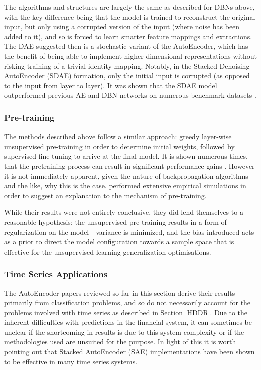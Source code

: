 \documentclass[a4paper,11pt,oneside]{article}
\theoremstyle{plain}
\theoremstyle{definition}
\begin{document}
	The algorithms and structures are largely the same as described for DBNs above, with the key difference 
	being that the model is trained to reconstruct the original input, but only using a corrupted version of the input 
	(where noise has been added to it), and so is forced to learn smarter feature mappings and extractions. 
	The DAE suggested then is a stochastic variant of the AutoEncoder, which has the benefit of being able to 
	implement higher dimensional representations without risking training of a trivial identity mapping. Notably, 
	in the Stacked Denoising AutoEncoder (SDAE) formation, only the initial input is corrupted (as opposed to the 
	input from layer to layer). It was shown that the SDAE model outperformed previous AE and DBN networks on 
	numerous benchmark datasets \citep{Vincent} . 
	
	\subsubsection{Pre-training}
	
	The methods described above follow a similar approach: greedy layer-wise unsupervised pre-training in order to 
	determine initial weights, followed by supervised fine tuning to arrive at the final model. It is shown numerous times, 
	that the pretraining process can result in significant performance gains \citep{Vincent}. However it is not immediately apparent, 
	given the nature of backpropagation algorithms and the like, why this is the case. \citet{Erhan} performed 
	extensive empirical simulations in order to suggest an explanation to the mechanism of pre-training.
	\hfill \break 
	
	While their results were not entirely conclusive, they did lend themselves to a reasonable hypothesis: 
	the unsupervised pre-training results in a form of regularization on the model - variance is minimized, and the 
	bias introduced acts as a prior to direct the model configuration towards a sample space that is effective for the unsupervised 
	learning generalization optimisations.
	
	\subsubsection{Time Series Applications}
	
	The AutoEncoder papers reviewed so far in this section derive their results primarily from classification problems, 
	and so do not necessarily account for the problems involved with time series as described in Section \ref{HDDR}. Due to 
	the inherent difficulties with predictions in the financial system, it can sometimes be unclear if the shortcoming in 
	results is due to this system complexity or if the methodologies used are unsuited for the purpose. In light of this 
	it is worth pointing out that Stacked AutoEncoder (SAE) implementations have been shown to be effective in many
	time series systems.  
	\hfill \break 
	
\end{document}
